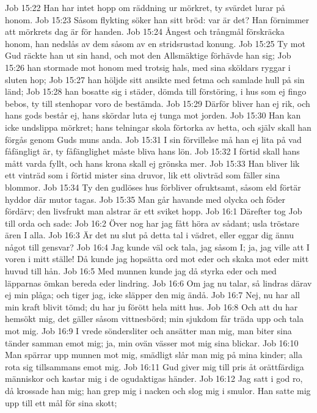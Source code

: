 Job 15:22  Han har intet hopp om räddning ur mörkret, ty svärdet lurar på honom.
Job 15:23  Såsom flykting söker han sitt bröd: var är det? Han förnimmer att mörkrets dag är för handen.
Job 15:24  Ångest och trångmål förskräcka honom, han nedslås av dem såsom av en stridsrustad konung.
Job 15:25  Ty mot Gud räckte han ut sin hand, och mot den Allsmäktige förhävde han sig;
Job 15:26  han stormade mot honom med trotsig hals, med sina sköldars ryggar i sluten hop;
Job 15:27  han höljde sitt ansikte med fetma och samlade hull på sin länd;
Job 15:28  han bosatte sig i städer, dömda till förstöring, i hus som ej fingo bebos, ty till stenhopar voro de bestämda.
Job 15:29  Därför bliver han ej rik, och hans gods består ej, hans skördar luta ej tunga mot jorden.
Job 15:30  Han kan icke undslippa mörkret; hans telningar skola förtorka av hetta, och själv skall han förgås genom Guds muns anda.
Job 15:31  I sin förvillelse må han ej lita på vad fåfängligt är, ty fåfänglighet måste bliva hans lön.
Job 15:32  I förtid skall hans mått varda fyllt, och hans krona skall ej grönska mer.
Job 15:33  Han bliver lik ett vinträd som i förtid mister sina druvor, lik ett olivträd som fäller sina blommor.
Job 15:34  Ty den gudlöses hus förbliver ofruktsamt, såsom eld förtär hyddor där mutor tagas.
Job 15:35  Man går havande med olycka och föder fördärv; den livsfrukt man alstrar är ett sviket hopp.
Job 16:1  Därefter tog Job till orda och sade:
Job 16:2  Över nog har jag fått höra av sådant; usla tröstare ären I alla.
Job 16:3  Är det nu slut på detta tal i vädret, eller eggar dig ännu något till gensvar?
Job 16:4  Jag kunde väl ock tala, jag såsom I; ja, jag ville att I voren i mitt ställe! Då kunde jag hopsätta ord mot eder och skaka mot eder mitt huvud till hån.
Job 16:5  Med munnen kunde jag då styrka eder och med läpparnas ömkan bereda eder lindring.
Job 16:6  Om jag nu talar, så lindras därav ej min plåga; och tiger jag, icke släpper den mig ändå.
Job 16:7  Nej, nu har all min kraft blivit tömd; du har ju förött hela mitt hus.
Job 16:8  Och att du har hemsökt mig, det gäller såsom vittnesbörd; min sjukdom får träda upp och tala mot mig.
Job 16:9  I vrede söndersliter och ansätter man mig, man biter sina tänder samman emot mig; ja, min ovän vässer mot mig sina blickar.
Job 16:10  Man spärrar upp munnen mot mig, smädligt slår man mig på mina kinder; alla rota sig tillsammans emot mig.
Job 16:11  Gud giver mig till pris åt orättfärdiga människor och kastar mig i de ogudaktigas händer.
Job 16:12  Jag satt i god ro, då krossade han mig; han grep mig i nacken och slog mig i smulor. Han satte mig upp till ett mål för sina skott;
